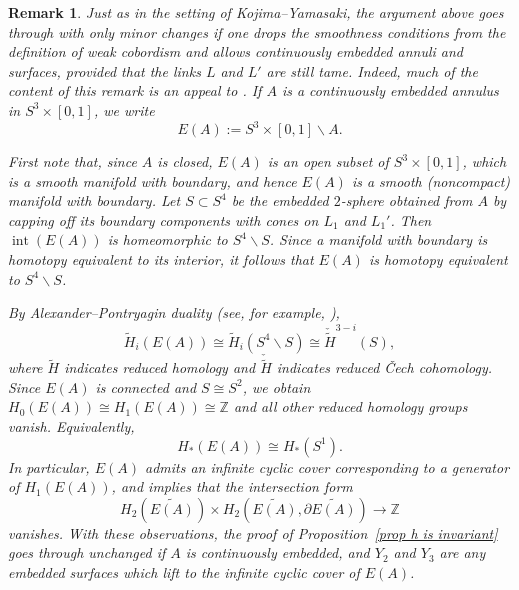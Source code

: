 \documentclass[a4paper, 11pt]{amsart}
\newtheorem{remark}[theorem]{Remark}
\theoremstyle{definition}
\newcommand{\bdry}{\partial}
\newcommand{\Z}{\mathbb{Z}}
\begin{document}
\begin{remark}\label{rmk: what if I-equiv}
Just as in the setting of Kojima--Yamasaki, the argument above goes through with only minor changes if one drops the smoothness conditions from the definition of weak cobordism and allows continuously embedded annuli and surfaces, provided that the links $L$ and $L'$ are still tame. Indeed, much of the content of this remark is an appeal to \cite[Lemma~5]{KojYam79}. If $A$ is a continuously embedded annulus in $S^3\times[0,1]$, we write
\[
E(A):=S^3\times[0,1]\smallsetminus A.
\]



First note that, since $A$ is closed, $E(A)$ is 
an open subset of $S^3\times[0,1]$, which is a smooth
manifold with boundary, 
and hence $E(A)$ is a smooth (noncompact)
manifold with boundary. Let $S\subset S^4$ be the embedded $2$-sphere obtained
from $A$ by capping off its boundary components with cones on $L_1$ and $L_1'$.
Then $\operatorname{int}(E(A))$ is homeomorphic to $S^4\smallsetminus S$.
Since a manifold with boundary is homotopy equivalent to its interior, it
follows that $E(A)$ is homotopy equivalent to $S^4\smallsetminus S$.

By Alexander--Pontryagin duality (see, for example, \cite[Theorem~74.1]{Munkres84}),
\[
\widetilde{H}_i(E(A))\cong \widetilde{H}_i(S^4\smallsetminus S)\cong \check{\widetilde{H}}^{3-i}(S),
\]
where $\widetilde{H}$ indicates reduced  homology and $\check{\widetilde{H}}$ indicates reduced \v{C}ech cohomology.   Since $E(A)$ is connected and \(S\cong S^2\),  we obtain
\(
H_0(E(A))\cong H_1(E(A))\cong \Z
\)
and all other reduced homology groups vanish. Equivalently,
\[
H_*(E(A))\cong H_*(S^1).
\]
In particular, \(E(A)\) admits an infinite cyclic cover corresponding to a
generator of \(H_1(E(A))\), and \cite[Lemma~5]{KojYam79} 
implies that the intersection form
$$H_2(\widetilde{E(A)})\times H_2(\widetilde{E(A)}, \bdry\widetilde{E(A)})\to \Z$$
vanishes. With these observations, the proof of Proposition~\ref{prop h is invariant} goes through unchanged if $A$ is continuously embedded, and $Y_2$ and $Y_3$ are any embedded surfaces which lift to the infinite cyclic cover of $E(A)$.
\end{remark}
\end{document}
